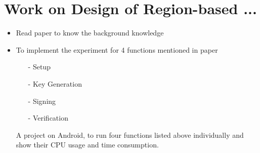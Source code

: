 \section{Work on Design of Region-based ...}
\label{Retransmission-Based}
    \begin{itemize}
        \item {Read paper to know the background knowledge}
        \item {To implement the experiment for 4 functions mentioned in paper}
        \begin{itemize}    
            \item[-]{Setup}
            \item[-]{Key Generation}
            \item[-]{Signing}
            \item[-]{Verification}
        \end{itemize}
        A project on Android, to run four functions listed above individually and show their CPU usage and time consumption.
    \end{itemize}
